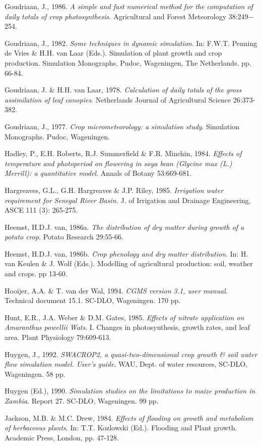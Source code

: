 Goudriaan, J., 1986. {\it A simple and fast numerical method for the computation of daily totals
of crop photosynthesis.\/} Agricultural and Forest Meteorology 38:249$-$254. 

Goudriaan, J., 1982. {\it Some techniques in dynamic simulation\/}. In:  F.W.T. Penning de Vries
\& H.H. van Laar (Eds.). Simulation of plant growth and crop production. Simulation
Monographs, Pudoc, Wageningen, The Netherlands. pp. 66-84.

Goudriaan, J. \& H.H. van Laar, 1978. {\it Calculation of daily totals of the gross assimilation
of leaf canopies\/}. Netherlands Journal of Agricultural Science 26:373-382.

\bigskip
Goudriaan, J., 1977. {\it Crop micrometeorology: a simulation study\/}. Simulation Monographs.
Pudoc, Wageningen.

Hadley, P., E.H. Roberts, R.J. Summerfield \& F.R. Minchin, 1984. {\it Effects of temperature
and photoperiod on flowering in soya bean (Glycine max (L.) Merrill): a quantitative model\/}.
Annals of Botany 53:669-681.

Hargreaves, G.L., G.H. Hargreaves \& J.P. Riley, 1985. {\it Irrigation water requirement for
Senegal River Basin.\/} J. of Irrigation and Drainage Engineer\-ing, ASCE 111 (3): 265-275.

Heemst, H.D.J. van, 1986a. {\it The distribution of dry matter during growth of a potato crop\/}. Potato
Research 29:55-66. 

Heemst, H.D.J. van, 1986b. {\it Crop phenology and dry matter distribution\/}. In:  H. van Keulen \& J.
Wolf (Eds.). Modelling of agricultural production: soil, weather and crops. pp 13-60.

Hooijer, A.A. \& T. van der Wal, 1994. {\it CGMS version 3.1, user manual\/}. Technical document 15.1.
SC-DLO, Wageningen. 170 pp.

Hunt, E.R., J.A. Weber \& D.M. Gates, 1985. {\it Effects of nitrate application on Amaranthus powellii
Wats\/}. I. Changes in photosynthesis, growth rates, and leaf area. Plant Physiology 79:609-613.

Huygen, J., 1992. {\it SWACROP2, a quasi-two-dimensional crop growth \& soil water flow simulation
model. User's guide\/}. WAU, Dept. of water resources, SC-DLO, Wageningen. 58 pp.

Huygen (Ed.), 1990. {\it Simulation studies on the limitations to maize production in Zambia\/}. Report 27.
SC-DLO, {\nobreak}Wageningen. 99 pp.

Jackson, M.B. \& M.C. Drew, 1984. {\it Effects of flooding on growth and metabolism of herbaceous
plants\/}. In: T.T. Kozlowski (Ed.). Flooding and Plant growth. Academic Press, London, pp. 47-128.

